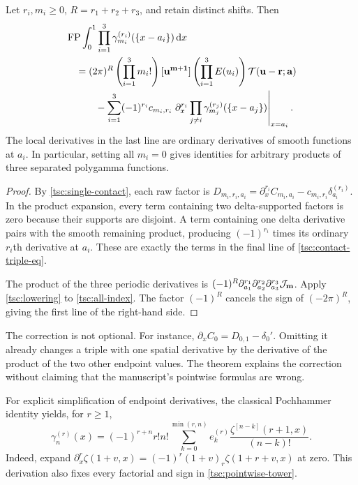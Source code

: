 \begin{theorem}\label{tsc:contact-triple}
Let $r_i,m_i\ge0$, $R=r_1+r_2+r_3$, and retain distinct shifts. Then
\begin{align}\label{tsc:contact-triple-eq}
 &\operatorname{FP}\int_0^1\prod_{i=1}^3
            \gamma_{m_i}^{(r_i)}(\{x-a_i\})\,\mathrm d x\notag\\
 &\quad=(2\pi)^R\left(\prod_{i=1}^3m_i!\right)
    [\mathbf u^{\mathbf m+\mathbf1}]
        \left(\prod_{i=1}^3E(u_i)\right)
                       \mathcal T(\mathbf u-\mathbf r;\mathbf a)\notag\\
 &\qquad\quad-
    \sum_{i=1}^3(-1)^{r_i}c_{m_i,r_i}
       \left.\partial_x^{r_i}
              \prod_{j\ne i}\gamma_{m_j}^{(r_j)}(\{x-a_j\})
       \right|_{x=a_i}.
\end{align}
The local derivatives in the last line are ordinary derivatives of smooth
functions at $a_i$. In particular, setting all $m_i=0$ gives identities for
arbitrary products of three separated polygamma functions.
\end{theorem}
\begin{proof}
By \eqref{tsc:single-contact}, each raw factor is
$D_{m_i,r_i,a_i}=\partial_x^{r_i}C_{m_i,a_i}
                 -c_{m_i,r_i}\delta_{a_i}^{(r_i)}$.
In the product expansion, every term containing two delta-supported
factors is zero because their supports are disjoint. A term containing
one delta derivative pairs with the smooth remaining product, producing
$(-1)^{r_i}$ times its ordinary $r_i$th derivative at $a_i$. These are
exactly the terms in the final line of \eqref{tsc:contact-triple-eq}.

The product of the three periodic derivatives is
$(-1)^R\partial_{a_1}^{r_1}\partial_{a_2}^{r_2}\partial_{a_3}^{r_3}
\mathcal J_{\mathbf m}$. Apply \eqref{tsc:lowering} to
\eqref{tsc:all-index}. The factor $(-1)^R$ cancels the sign of
$(-2\pi)^R$, giving the first line of the right-hand side.
\end{proof}

The correction is not optional. For instance,
$\partial_x C_0=D_{0,1}-\delta_0'$. Omitting it already changes a triple
with one spatial derivative by the derivative of the product of the two
other endpoint values. The theorem explains the correction without
claiming that the manuscript's pointwise formulas are wrong.

For explicit simplification of endpoint derivatives, the classical
Pochhammer identity yields, for $r\ge1$,
\begin{equation}\label{tsc:pointwise-tower}
 \gamma_n^{(r)}(x)=(-1)^{r+n}r!n!
      \sum_{k=0}^{\min(r,n)}
       e_k^{(r)}\frac{\zeta^{[n-k]}(r+1,x)}{(n-k)!}.
\end{equation}
Indeed, expand
$\partial_x^r\zeta(1+v,x)=(-1)^r(1+v)_r\zeta(1+r+v,x)$ at zero.
This derivation also fixes every factorial and sign in
\eqref{tsc:pointwise-tower}.

